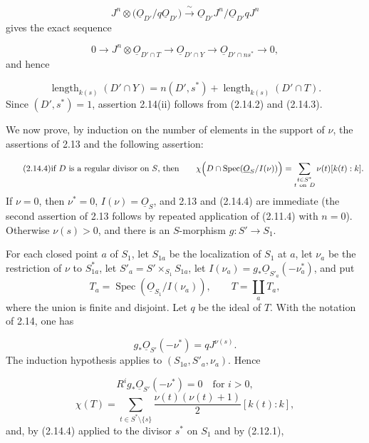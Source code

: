 \begin{equation*}
J^n\otimes
\bigl(\underline{O}_{D'}/q\underline{O}_{D'}\bigr)
\xrightarrow{\;\sim\;}
\underline{O}_{D'}J^n/
\underline{O}_{D'}qJ^n
\end{equation*}
gives the exact sequence

\begin{equation*}
0\longrightarrow
J^n\otimes\underline{O}_{D'\cap T}
\longrightarrow\underline{O}_{D'\cap Y}
\longrightarrow\underline{O}_{D'\cap ns^*}
\longrightarrow0,
\end{equation*}
and hence


\begin{equation}\tag{2.14.3}
\operatorname{length}_{k(s)}(D'\cap Y)
=n(D',s^*)+\operatorname{length}_{k(s)}(D'\cap T).
\end{equation}
Since $(D',s^*)=1$, assertion 2.14(ii) follows from (2.14.2) and (2.14.3).

We now prove, by induction on the number of elements in the support of $\nu$,
the assertions of 2.13 and the following assertion:

\begin{equation}\tag{2.14.4}
\text{if $D$ is a regular divisor on $S$, then}\qquad
\chi\Bigl(D\cap\operatorname{Spec}(\underline{O}_S/I(\nu))\Bigr)
=\sum_{\substack{t\in S^*\\t\ \mathrm{on}\ D}}
\nu(t)[k(t):k].
\end{equation}
If $\nu=0$, then $\nu^*=0$, $I(\nu)=\underline{O}_S$, and 2.13 and (2.14.4)
are immediate (the second assertion of 2.13 follows by repeated application of
(2.11.4) with $n=0$).  Otherwise $\nu(s)>0$, and there is an $S$-morphism
$g:S'\longrightarrow S_1$.

For each closed point $a$ of $S_1$, let $S_{1a}$ be the localization of $S_1$
at $a$, let $\nu_a$ be the restriction of $\nu$ to $S_{1a}^*$, let
$S'_a=S'\times_{S_1}S_{1a}$, let
$I(\nu_a)=g_*\underline{O}_{S'_a}(-\nu_a^*)$, and put
\[
T_a=\operatorname{Spec}(\underline{O}_{S_1}/I(\nu_a)),\qquad
T=\coprod_aT_a,
\]
where the union is finite and disjoint.  Let $q$ be the ideal of $T$.  With the
notation of 2.14, one has

\begin{equation}\tag{2.14.5}
g_*\underline{O}_{S'}(-\nu^*)=qJ^{\nu(s)}.
\end{equation}
The induction hypothesis applies to $(S_{1a},S'_a,\nu_a)$.  Hence

\begin{equation}\tag{2.14.6}
R^ig_*\underline{O}_{S'}(-\nu^*)=0\quad\text{for }i>0,
\end{equation}
\begin{equation}\tag{2.14.7}
\chi(T)=
\sum_{t\in S^*\setminus\{s\}}
\frac{\nu(t)(\nu(t)+1)}2[k(t):k],
\end{equation}
and, by (2.14.4) applied to the divisor $s^*$ on $S_1$ and by (2.12.1),

